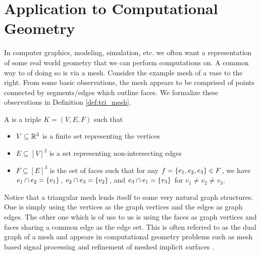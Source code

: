 \documentclass[11pt]{article}
\begin{document}
\section{Application to Computational Geometry}
\begin{figure}
    \centering
\end{figure}

In computer graphics, modeling, simulation, etc. we often want a representation of some real world geometry that we can perform computations on. A common way to of doing so is via a mesh. Consider the example mesh of a vase to the right. From some basic observations, the mesh appears to be comprised of points connected by segments/edges which outline faces. We formalize these observations in Definition \ref{def:tri_mesh}.

\begin{definition}
    \label{def:tri_mesh}
    A  is a triple $K = (V, E, F)$ such that
    \begin{itemize}
        \item $V \subseteq \mathbb{R}^3$ is a finite set representing the vertices
        \item $E \subseteq [V]^2$ is a set representing non-intersecting edges
        \item $F \subseteq [E]^3$ is the set of faces such that for any $f = \qty{e_1, e_2, e_3} \in F$, we have $e_1 \cap e_2 = \qty{v_1}$, $e_2 \cap e_3 = \qty{v_2}$, and $e_3 \cap e_1 = \qty{v_3}$ for $v_1 \neq v_2 \neq v_3$. 
    \end{itemize}
\end{definition}

Notice that a triangular mesh lends itself to some very natural graph structures. One is simply using the vertices as the graph vertices and the edges as graph edges. The other one which is of use to us is using the faces as graph vertices and faces sharing a common edge as the edge set. This is often referred to as the dual graph of a mesh and appears in computational geometry problems such as mesh based signal processing \cite{taubinDualMeshResampling2002} and refinement of meshed implicit surfaces \cite{10.1145/566282.566308}. 
\end{document}
